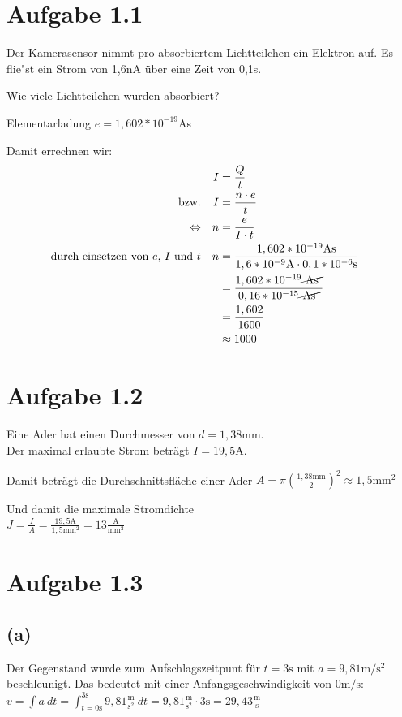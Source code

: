 \documentclass[]{article}
\newcommand{\del}[1]{\cancel{~#1~}}
\newcommand{\eq}{\Leftrightarrow}
\newcommand{\unit}[1]{\text{#1}}
\newcommand{\fracunit}[2]{\frac{\unit{#1}}{\unit{#2}}}
\begin{document}
\section*{Aufgabe 1.1}
\par
	Der Kamerasensor nimmt pro absorbiertem Lichtteilchen ein Elektron auf.
	Es flie"st ein Strom von 1,6nA über eine Zeit von 0,1\textmu s.

	Wie viele Lichtteilchen wurden absorbiert?

	Elementarladung $e = 1,602*10^{-19}$As

	Damit errechnen wir:
	\begin{align*}
	&&	I &= \frac{Q}{t} &&\\
	\text{bzw.}&&  I &= \frac{n \cdot e}{t} &&\\
	\eq&&  n &= \frac{e}{I \cdot t} &&\\
	\text{durch einsetzen von $e$, $I$ und $t$} && n &= \frac{1,602*10^{-19}\unit{As}}{1,6*10^{-9}\unit{A} \cdot 0,1*10^{-6}\unit{s}}&&\\
	&& &= \frac{1,602*10^{-19}\del{\unit{As}}}{0,16*10^{-15}\del{\unit{As}}} &&\\
	&& &= \frac{1,602}{1600} &&\\
	&& &\approx 1000 &&\\
	\end{align*}
\section*{Aufgabe 1.2}
\par
	Eine Ader hat einen Durchmesser von $d = 1,38\unit{mm}$.\\ Der maximal erlaubte Strom beträgt $I = 19,5\unit{A}$.

	Damit beträgt die Durchschnittsfläche einer Ader $A = \pi \left(\frac{1,38\unit{mm}}{2}\right)^2 \approx 1,5\unit{mm}^2$

	Und damit die maximale Stromdichte\\
	$ J = \frac{I}{A} = \frac{19,5\unit{A}}{1,5\unit{mm}^2} = 13 \frac{\unit{A}}{\text{mm}^2}$

\section*{Aufgabe 1.3}
\par
\subsection*{(a)}
	Der Gegenstand wurde zum Aufschlagszeitpunt für $t=3\unit{s}$ mit $a=9,81 \unit{m}/\unit{s}^2$ beschleunigt. Das bedeutet mit einer Anfangsgeschwindigkeit von $0\unit{m}/\unit{s}$:\\
	$ v = \int a~dt = \int_{t = 0\unit{s}}^{3\unit{s}}9,81\frac{\unit{m}}{\text{s}^2}~dt = 9,81\frac{\unit{m}}{\text{s}^2} \cdot 3\unit{s} = 29,43\fracunit{m}{s}$
\end{document}
